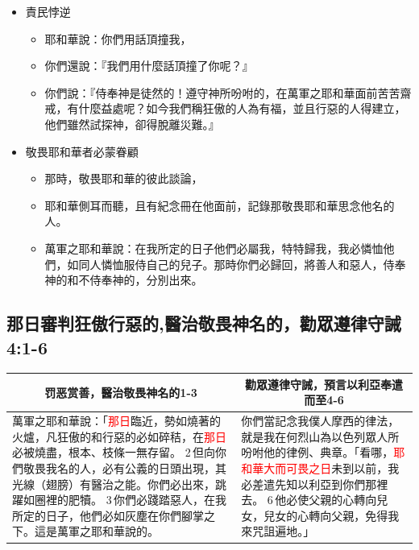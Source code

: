 \begin{itemize} 
\itemsep-.35em 
\item 責民悖逆\\
\begin{itemize} 
\itemsep-.35em 
\item 耶和華說：你們用話頂撞我，
\item 你們還說：『我們用什麼話頂撞了你呢？』 
\item 你們說：『侍奉神是徒然的！遵守神所吩咐的，在萬軍之耶和華面前苦苦齋戒，有什麼益處呢？如今我們稱狂傲的人為有福，並且行惡的人得建立，他們雖然試探神，卻得脫離災難。』
\end{itemize}
\item 敬畏耶和華者必蒙眷顧\\
\begin{itemize} 
\itemsep-.35em 
\item 那時，敬畏耶和華的彼此談論，
\item 耶和華側耳而聽，且有紀念冊在他面前，記錄那敬畏耶和華思念他名的人。 
\item 萬軍之耶和華說：在我所定的日子他們必屬我，特特歸我，我必憐恤他們，如同人憐恤服侍自己的兒子。那時你們必歸回，將善人和惡人，侍奉神的和不侍奉神的，分別出來。
\end{itemize}
\end{itemize}

\subsection{那日審判狂傲行惡的,醫治敬畏神名的，勸眾遵律守誡  4:1-6}
\begin{table}[H]
\centering
\begin{tabular}{p{10.75cm}|p{6.50cm}}\hline\hline
\multicolumn{1}{c|}{罚恶赏善，醫治敬畏神名的1-3}&\multicolumn{1}{c}{勸眾遵律守誡，預言以利亞奉遣而至4-6}\\\hline
萬軍之耶和華說：「\textcolor{red}{那日}臨近，勢如燒著的火爐，凡狂傲的和行惡的必如碎秸，在\textcolor{red}{那日}必被燒盡，根本、枝條一無存留。 2 但向你們敬畏我名的人，必有公義的日頭出現，其光線（翅膀）有醫治之能。你們必出來，跳躍如圈裡的肥犢。 3 你們必踐踏惡人，在我所定的日子，他們必如灰塵在你們腳掌之下。這是萬軍之耶和華說的。
&你們當記念我僕人摩西的律法，就是我在何烈山為以色列眾人所吩咐他的律例、典章。「看哪，\textcolor{red}{耶和華大而可畏之日}未到以前，我必差遣先知以利亞到你們那裡去。 6 他必使父親的心轉向兒女，兒女的心轉向父親，免得我來咒詛遍地。」\\\hline
\end{tabular}
\end{table}